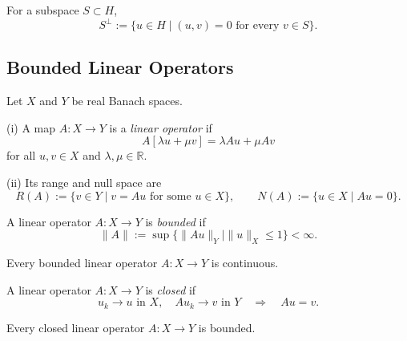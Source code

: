 \begin{definition}
\label{def:orthogonal-complement-subspace}

For a subspace $S\subset H$,
\[
S^\perp:=\{u\in H\mid(u,v)=0\text{ for every }v\in S\}.
\]
\end{definition}

\subsection{Bounded Linear Operators}
\label{sec:bounded-linear-operators}

Let $X$ and $Y$ be real Banach spaces.

\begin{definition}
\label{def:linear-operator-banach}

(i) A map $A:X\to Y$ is a \textit{linear operator} if
\[
A[\lambda u+\mu v]=\lambda Au+\mu Av
\]
for all $u,v\in X$ and $\lambda,\mu\in\mathbb R$.

(ii) Its range and null space are
\[
R(A):=\{v\in Y\mid v=Au\text{ for some }u\in X\},
\qquad
N(A):=\{u\in X\mid Au=0\}.
\]
\end{definition}

\begin{definition}
\label{def:bounded-linear-operator}

A linear operator $A:X\to Y$ is \textit{bounded} if
\[
\|A\|:=\sup\{\|Au\|_Y\mid\|u\|_X\leq1\}<\infty.
\]
\end{definition}

Every bounded linear operator $A:X\to Y$ is continuous.

\begin{definition}
\label{def:closed-linear-operator}
A linear operator $A:X\to Y$ is \textit{closed} if
\[
u_k\to u\text{ in }X,\quad Au_k\to v\text{ in }Y
\quad\Longrightarrow\quad Au=v.
\]
\end{definition}

\begin{theorem}
\label{thm:closed-graph-theorem}

Every closed linear operator $A:X\to Y$ is bounded.
\end{theorem}

